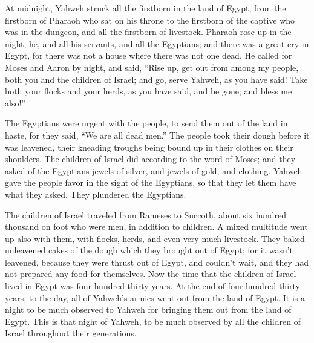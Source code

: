  At midnight, Yahweh struck all the firstborn in the land
of Egypt, from the firstborn of Pharaoh who sat on his throne to the
firstborn of the captive who was in the dungeon, and all the firstborn
of livestock.  Pharaoh rose up in the night, he, and all
his servants, and all the Egyptians; and there was a great cry in Egypt,
for there was not a house where there was not one dead.  He
called for Moses and Aaron by night, and said, ``Rise up, get out from
among my people, both you and the children of Israel; and go, serve
Yahweh, as you have said!  Take both your flocks and your
herds, as you have said, and be gone; and bless me also!''

 The Egyptians were urgent with the people, to send them
out of the land in haste, for they said, ``We are all dead men.''
 The people took their dough before it was leavened, their
kneading troughs being bound up in their clothes on their shoulders.
 The children of Israel did according to the word of Moses;
and they asked of the Egyptians jewels of silver, and jewels of gold,
and clothing.  Yahweh gave the people favor in the sight of
the Egyptians, so that they let them have what they asked. They
plundered the Egyptians.

 The children of Israel traveled from Rameses to Succoth,
about six hundred thousand on foot who were men, in addition to
children.  A mixed multitude went up also with them, with
flocks, herds, and even very much livestock.  They baked
unleavened cakes of the dough which they brought out of Egypt; for it
wasn't leavened, because they were thrust out of Egypt, and couldn't
wait, and they had not prepared any food for themselves. 
Now the time that the children of Israel lived in Egypt was four hundred
thirty years.  At the end of four hundred thirty years, to
the day, all of Yahweh's armies went out from the land of Egypt.
 It is a night to be much observed to Yahweh for bringing
them out from the land of Egypt. This is that night of Yahweh, to be
much observed by all the children of Israel throughout their
generations.

